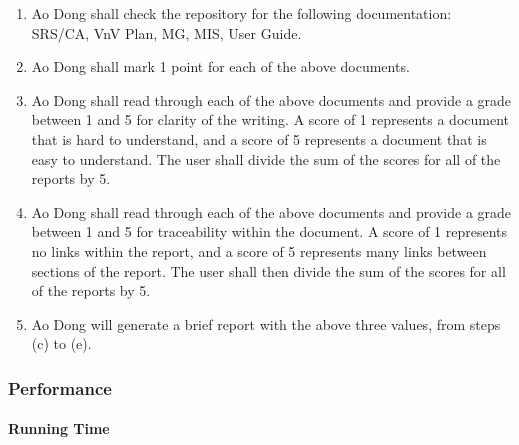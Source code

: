 \documentclass[12pt, titlepage]{article}
\begin{document}
\begin{enumerate}
\begin{enumerate}
\item Ao Dong shall check the repository for the following documentation:
SRS/CA, VnV Plan, MG, MIS, User Guide.
\item Ao Dong shall mark 1 point for each of the above documents.
\item Ao Dong shall read through each of the above documents and provide a grade
between 1 and 5 for clarity of the writing. A score of 1 represents a document
that is hard to understand, and a score of 5 represents a document that is easy
to understand. The user shall divide the sum of the scores for all of the
reports by 5.
\item Ao Dong shall read through each of the above documents and provide a grade
between 1 and 5 for traceability within the document. A score of 1 represents no
links within the report, and a score of 5 represents many links between sections
of the report. The user shall then divide the sum of the scores for all of the
reports by 5.
\item Ao Dong will generate a brief report with the above three values, from
steps (c) to (e).\\
\end{enumerate}

\end{enumerate}


\subsubsection{Performance}
\label{secperf}
		
\paragraph{Running Time}
\end{document}

